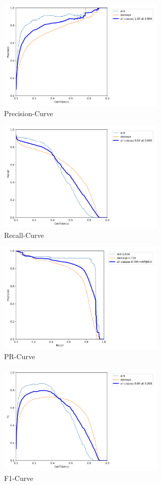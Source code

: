 \documentclass[conference]{IEEEtran}
\begin{document}
\begin{figure}[H]
    \centering
    \includegraphics[width=8cm]{Images/YOLOv5m/P_curve.png}
    \caption{Precision-Curve}
\end{figure}
\begin{figure}[H]
    \centering
    \includegraphics[width=8cm]{Images/YOLOv5m/R_curve.png}
    \caption{Recall-Curve}
\end{figure}
\begin{figure}[H]
    \centering
    \includegraphics[width=8cm]{Images/YOLOv5m/PR_curve.png}
    \caption{PR-Curve}
\end{figure}
\begin{figure}[H]
    \centering
    \includegraphics[width=8cm]{Images/YOLOv5m/F1_curve.png}
    \caption{F1-Curve}
\end{figure}
\end{document}
